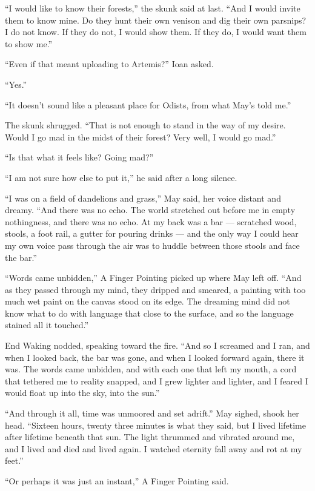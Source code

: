 ``I would like to know their forests,'' the skunk said at last. ``And I would invite them to know mine. Do they hunt their own venison and dig their own parsnips? I do not know. If they do not, I would show them. If they do, I would want them to show me.''

``Even if that meant uploading to Artemis?'' Ioan asked.

``Yes.''

``It doesn't sound like a pleasant place for Odists, from what May's told me.''

The skunk shrugged. ``That is not enough to stand in the way of my desire. Would I go mad in the midst of their forest? Very well, I would go mad.''

``Is that what it feels like? Going mad?''

``I am not sure how else to put it,'' he said after a long silence.

``I was on a field of dandelions and grass,'' May said, her voice distant and dreamy. ``And there was no echo. The world stretched out before me in empty nothingness, and there was no echo. At my back was a bar — scratched wood, stools, a foot rail, a gutter for pouring drinks — and the only way I could hear my own voice pass through the air was to huddle between those stools and face the bar.''

``Words came unbidden,'' A Finger Pointing picked up where May left off. ``And as they passed through my mind, they dripped and smeared, a painting with too much wet paint on the canvas stood on its edge. The dreaming mind did not know what to do with language that close to the surface, and so the language stained all it touched.''

End Waking nodded, speaking toward the fire. ``And so I screamed and I ran, and when I looked back, the bar was gone, and when I looked forward again, there it was. The words came unbidden, and with each one that left my mouth, a cord that tethered me to reality snapped, and I grew lighter and lighter, and I feared I would float up into the sky, into the sun.''

``And through it all, time was unmoored and set adrift.'' May sighed, shook her head. ``Sixteen hours, twenty three minutes is what they said, but I lived lifetime after lifetime beneath that sun. The light thrummed and vibrated around me, and I lived and died and lived again. I watched eternity fall away and rot at my feet.''

``Or perhaps it was just an instant,'' A Finger Pointing said.


